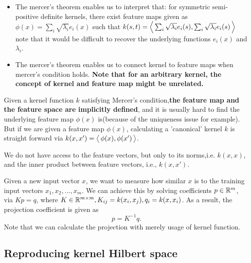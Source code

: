 \begin{refsection}
\begin{remark}\hfill
	\begin{itemize}
		\item The mercer's theorem enables us to interpret that: for symmetric semi-positive definite kernels, there exist feature maps given as $\phi(x) =\sum_i \sqrt{\lambda_i}e_i(x) $ such that $k(s,t) = {\left< \, \sum_i \sqrt{\lambda_i}e_i(s),\sum_i \sqrt{\lambda_i}e_i(s) \, \right>}$
		note that it would be difficult to recover the underlying functions $e_i(x)$ and $\lambda_i$.
		\item The mercer's theorem enables us to connect kernel to feature maps when mercer's condition holds. \textbf{Note that for an arbitrary kernel, the concept of kernel and feature map might be unrelated.} 
	\end{itemize}
\end{remark}



\begin{remark}
	Given a kernel function $k$ satisfying Mercer's condition,\textbf{the feature map and the feature space are implicitly defined}, and it is usually hard to find the underlying feature map $\phi(x)$ is(because of the uniqueness issue for example).
	But if we are given a feature map $\phi(x)$, calculating a 'canonical' kernel $k$ is straight forward via $k(x,x')={\left< \, \phi(x),\phi(x') \, \right>}$.
\end{remark}


\begin{remark}
	We do not have access to the feature vectors, but only to its norms,i.e. $k(x,x)$, and the inner product between feature vectors, i.e., $k(x,x')$.
\end{remark}




\begin{remark}
	Given a new input vector $x$, we want to measure how similar $x$ is to the training input vectors $x_1,x_2,...,x_m$. We can achieve this by solving coefficients $p\in \mathbb{R}^m$, via $Kp = q$, where $K\in \mathbb{R}^{m\times m}, K_{ij} = k(x_i,x_j), q_i=k(x,x_i)$. As a result, the projection coefficient is given as $$p = K^{-1}q.$$
	Note that we can calculate the projection with merely usage of kernel function.
\end{remark}


\subsection{Reproducing kernel Hilbert space}


\end{refsection}
